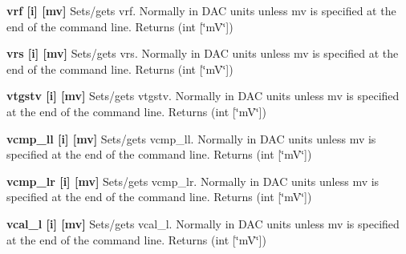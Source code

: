 \begin{DoxyItemize}
\item {\bfseries vrf \mbox{[}i\mbox{]} \mbox{[}mv\mbox{]}} Sets/gets vrf. Normally in DAC units unless {\ttfamily mv} is specified at the end of the command line. {\ttfamily Returns} {\ttfamily }(int \mbox{[}\char`\"{}mV\char`\"{}\mbox{]})
\end{DoxyItemize}


\begin{DoxyItemize}
\item {\bfseries vrs \mbox{[}i\mbox{]} \mbox{[}mv\mbox{]}} Sets/gets vrs. Normally in DAC units unless {\ttfamily mv} is specified at the end of the command line. {\ttfamily Returns} {\ttfamily }(int \mbox{[}\char`\"{}mV\char`\"{}\mbox{]})
\end{DoxyItemize}


\begin{DoxyItemize}
\item {\bfseries vtgstv \mbox{[}i\mbox{]} \mbox{[}mv\mbox{]}} Sets/gets vtgstv. Normally in DAC units unless {\ttfamily mv} is specified at the end of the command line. {\ttfamily Returns} {\ttfamily }(int \mbox{[}\char`\"{}mV\char`\"{}\mbox{]})
\end{DoxyItemize}


\begin{DoxyItemize}
\item {\bfseries vcmp\_\-ll \mbox{[}i\mbox{]} \mbox{[}mv\mbox{]}} Sets/gets vcmp\_\-ll. Normally in DAC units unless {\ttfamily mv} is specified at the end of the command line. {\ttfamily Returns} {\ttfamily }(int \mbox{[}\char`\"{}mV\char`\"{}\mbox{]})
\end{DoxyItemize}


\begin{DoxyItemize}
\item {\bfseries vcmp\_\-lr \mbox{[}i\mbox{]} \mbox{[}mv\mbox{]}} Sets/gets vcmp\_\-lr. Normally in DAC units unless {\ttfamily mv} is specified at the end of the command line. {\ttfamily Returns} {\ttfamily }(int \mbox{[}\char`\"{}mV\char`\"{}\mbox{]})
\end{DoxyItemize}


\begin{DoxyItemize}
\item {\bfseries vcal\_\-l \mbox{[}i\mbox{]} \mbox{[}mv\mbox{]}} Sets/gets vcal\_\-l. Normally in DAC units unless {\ttfamily mv} is specified at the end of the command line. {\ttfamily Returns} {\ttfamily }(int \mbox{[}\char`\"{}mV\char`\"{}\mbox{]})
\end{DoxyItemize}


